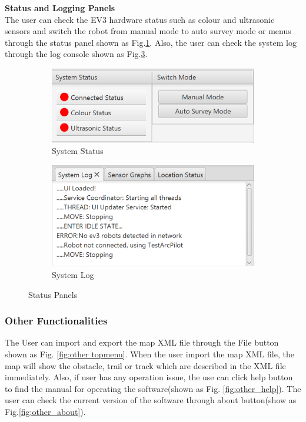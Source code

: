 \textbf{Status and Logging Panels}\\
The user can check the EV3 hardware status such as colour and ultrasonic sensors and switch the robot from manual mode to auto survey mode or menus through the status panel shown as Fig.\ref{fig:panelStatus}. Also, the user can check the system log through the log console shown as Fig.\ref{fig:panelLog}.

\begin{figure}[H]
	\centering
	\begin{subfigure}[t]{0.5\textwidth}
		\includegraphics[width=0.95\linewidth]{Systemstatus.png}  
		\caption{System Status}
		\label{fig:panelStatus}                
	\end{subfigure}
	\begin{subfigure}[t]{0.45\textwidth}
		\includegraphics[width=0.95\linewidth]{SystemLog.png}  
		\caption{System Log}
		\label{fig:panelLog}
	\end{subfigure}
	\caption{Status Panels}
\end{figure}

\subsubsection{Other Functionalities}
The User can import and export the map XML file through the File button shown as Fig. \ref{fig:other topmenu}. When the user import the map XML file, the map will show the obstacle, trail or track which are described in the XML file immediately. Also, if user has any operation issue, the use can click help button to find the manual for operating the software(shown as Fig. \ref{fig:other_help}). The user can check the current version of the software through about button(show as Fig.\ref{fig:other_about}).

